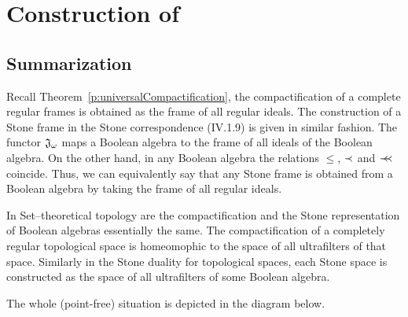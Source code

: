 \chapter{Construction of \R}

\section{Summarization}

Recall Theorem~\ref{p:universalCompactification}, the compactification of a complete regular frames is obtained as the frame of all regular ideals. The construction of a Stone frame in the Stone correspondence (IV.1.9) is given in similar fashion. The functor $\mathfrak{J}_{\omega}$ maps a Boolean algebra to the frame of all ideals of the Boolean algebra. On the other hand, in any Boolean algebra the relations $\leq$, $\prec$ and $\prec\mkern-7mu\prec$ coincide. Thus, we can equivalently say that any Stone frame is obtained from a Boolean algebra by taking the frame of all regular ideals.

In Set--theoretical topology are the compactification and the Stone representation of Boolean algebras essentially the same.
The compactification of a completely regular topological space is homeomophic to the space of all ultrafilters of that space. Similarly in the Stone duality for topological spaces, each Stone space is constructed as the space of all ultrafilters of some Boolean algebra.

The whole (point-free) situation is depicted in the diagram below.


